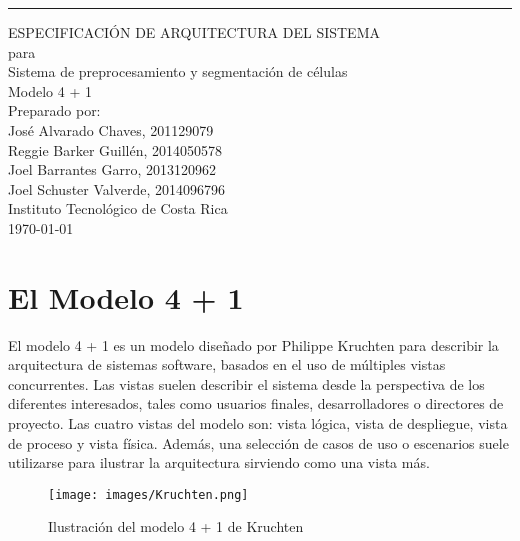 \documentclass{scrreprt}
\date{}
\begin{document}
\begin{flushright}
	\rule{16cm}{0.2cm}\vskip1cm
    \begin{bfseries}
        \Huge{ESPECIFICACIÓN DE ARQUITECTURA DEL SISTEMA}\\
        \vspace{0.5cm}
        para\\
        \vspace{0.5cm}
        Sistema de preprocesamiento y segmentación de células\\
        \vspace{1.0cm}
        \LARGE{Modelo 4 + 1}\\
        \vspace{1.0cm}
        Preparado por:\\ \vspace{0.5cm}
        	José Alvarado Chaves, 201129079\\
            Reggie Barker Guillén, 2014050578\\
            Joel Barrantes Garro, 2013120962\\
            Joel Schuster Valverde, 2014096796\\                        
        \vspace{1.5cm}
        Instituto Tecnológico de Costa Rica\\
        \vspace{1.5cm}
        \today\\
    \end{bfseries}
\end{flushright}


\tableofcontents


\chapter{El Modelo 4 + 1}

El modelo 4 + 1 es un modelo diseñado por Philippe Kruchten para describir la arquitectura de sistemas software, basados en el uso de múltiples vistas concurrentes. Las vistas suelen describir el sistema desde la perspectiva de los diferentes interesados, tales como usuarios finales, desarrolladores o directores de proyecto. Las cuatro vistas del modelo son: vista lógica, vista de despliegue, vista de proceso y vista física. Además, una selección de casos de uso o escenarios suele utilizarse para ilustrar la arquitectura sirviendo como una vista más.\\

\begin{figure}[H]
	\centering
    \texttt{[image: images/Kruchten.png]}
    \caption{Ilustración del modelo 4 + 1 de Kruchten}\label{Kruchten}
\end{figure}
\end{document}
